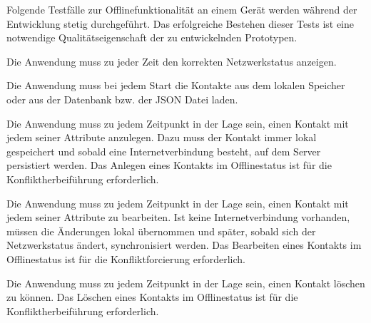 Folgende Testfälle zur Offlinefunktionalität an einem Gerät werden während der Entwicklung stetig durchgeführt.
Das erfolgreiche Bestehen dieser Tests ist eine notwendige Qualitätseigenschaft der zu entwickelnden Prototypen.
\begin{description}[leftmargin=0.7cm,style=nextline]
%
\item[Netzwerkstatus:] 
Die Anwendung muss zu jeder Zeit den korrekten Netzwerkstatus anzeigen.\\
\item[Kontakte lesen:] 
Die Anwendung muss bei jedem Start die Kontakte aus dem lokalen Speicher oder aus der Datenbank bzw. der \gls{JSON} Datei laden.\\
%
\item[Kontakt anlegen:] 
Die Anwendung muss zu jedem Zeitpunkt in der Lage sein, einen Kontakt mit jedem seiner Attribute anzulegen.
Dazu muss der Kontakt immer lokal gespeichert und sobald eine Internetverbindung besteht, auf dem Server persistiert werden.
Das Anlegen eines Kontakts im Offlinestatus ist für die Konfliktherbeiführung erforderlich.\\
%
\item[Kontakt bearbeiten:] 
Die Anwendung muss zu jedem Zeitpunkt in der Lage sein, einen Kontakt mit jedem seiner Attribute zu bearbeiten.
Ist keine Internetverbindung vorhanden, müssen die Änderungen lokal übernommen und später, sobald sich der Netzwerkstatus ändert, synchronisiert werden.
Das Bearbeiten eines Kontakts im Offlinestatus ist für die Konfliktforcierung erforderlich.\\
%
\item[Kontakt löschen:] 
Die Anwendung muss zu jedem Zeitpunkt in der Lage sein, einen Kontakt löschen zu können.
Das Löschen eines Kontakts im Offlinestatus ist für die Konfliktherbeiführung erforderlich.
\end{description}